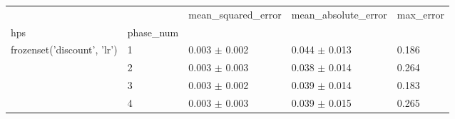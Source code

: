 \begin{tabular}{lllll}
\toprule
 &  & mean_squared_error & mean_absolute_error & max_error \\
hps & phase_num &  &  &  \\
\midrule
\multirow[t]{4}{*}{frozenset({'discount', 'lr'})} & 1 & 0.003 $\pm$ 0.002 & 0.044 $\pm$ 0.013 & 0.186 \\
 & 2 & 0.003 $\pm$ 0.003 & 0.038 $\pm$ 0.014 & 0.264 \\
 & 3 & 0.003 $\pm$ 0.002 & 0.039 $\pm$ 0.014 & 0.183 \\
 & 4 & 0.003 $\pm$ 0.003 & 0.039 $\pm$ 0.015 & 0.265 \\
\cline{1-5}
\bottomrule
\end{tabular}
